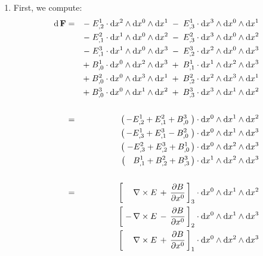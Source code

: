 \proof
\begin{enumerate}
\item
	First, we compute:
	\begin{eqnarray*}
	\d\,\mathbf{F}
	& = &
		   - \; E^{1}_{,2} \cdot \d x^{2} \wedge \d x^{0} \wedge \d x^{1}
		\; - \; E^{1}_{,3} \cdot \d x^{3} \wedge \d x^{0} \wedge \d x^{1}
	\\
	&&
		   - \; E^{2}_{,1} \cdot \d x^{1} \wedge \d x^{0} \wedge \d x^{2}
		\; - \; E^{2}_{,3} \cdot \d x^{3} \wedge \d x^{0} \wedge \d x^{2}
	\\
	&&
		   - \; E^{3}_{,1} \cdot \d x^{1} \wedge \d x^{0} \wedge \d x^{3}
		\; - \; E^{3}_{,2} \cdot \d x^{2} \wedge \d x^{0} \wedge \d x^{3}
	\\
	&&
		  +\; B^{1}_{,0} \cdot \d x^{0} \wedge \d x^{2} \wedge \d x^{3}
		\;+\; B^{1}_{,1} \cdot \d x^{1} \wedge \d x^{2} \wedge \d x^{3}
	\\
	&&
		  +\; B^{2}_{,0} \cdot \d x^{0} \wedge \d x^{3} \wedge \d x^{1}
		\;+\; B^{2}_{,2} \cdot \d x^{2} \wedge \d x^{3} \wedge \d x^{1}
	\\
	&&
		  +\; B^{3}_{,0} \cdot \d x^{0} \wedge \d x^{1} \wedge \d x^{2}
		\;+\; B^{3}_{,3} \cdot \d x^{3} \wedge \d x^{1} \wedge \d x^{2}
	\\ \\
	& = &
		\left(\,
			- E^{1}_{,2} 
			+ E^{2}_{,1} 
			+ B^{3}_{,0}
			\;\right)
		\cdot \d x^{0} \wedge \d x^{1} \wedge \d x^{2}
	\\
	&&
		\left(\,
			- E^{1}_{,3}
			+ E^{3}_{,1}
			- B^{2}_{,0}
			\;\right)
		\cdot \d x^{0} \wedge \d x^{1} \wedge \d x^{3}
	\\
	&&
		\left(\;
			- E^{2}_{,3}
			+ E^{3}_{,2}
			+ B^{1}_{,0}
			\,\right)
		\cdot \d x^{0} \wedge \d x^{2} \wedge \d x^{3}
	\\
	&&
		\left(\,
			{\color{white}+} B^{1}_{,1}
			+ B^{2}_{,2}
			+ B^{3}_{,3}
			\,\right)
		\cdot \d x^{1} \wedge \d x^{2} \wedge \d x^{3}
	\\ \\
	& = &
		\left[\;
			{\color{white}+}\,
			\nabla \times E \,+\, \dfrac{\partial B}{\partial x^{0}}
			\,\right]_{3}
		\cdot \d x^{0} \wedge \d x^{1} \wedge \d x^{2}
	\\
	&&
		\left[\;
			-\,
			\nabla \times E \,-\, \dfrac{\partial B}{\partial x^{0}}
			\,\right]_{2}
		\cdot \d x^{0} \wedge \d x^{1} \wedge \d x^{3}
	\\
	&&
		\left[\;
			{\color{white}+}\,
			\nabla \times E \,+\, \dfrac{\partial B}{\partial x^{0}}
			\,\right]_{1}
		\cdot \d x^{0} \wedge \d x^{2} \wedge \d x^{3}

\end{eqnarray*}
\end{enumerate}
